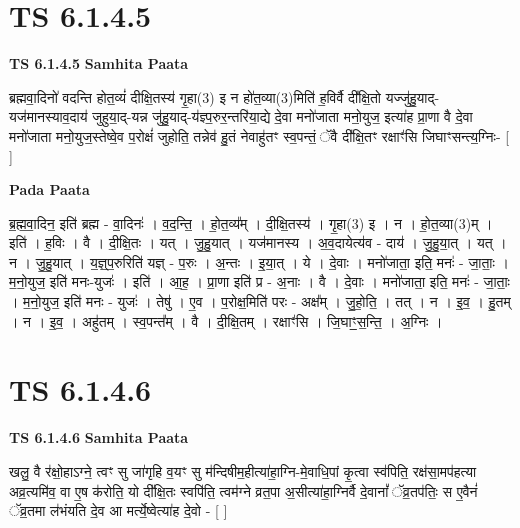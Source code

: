\documentclass[17pt]{extarticle}
\begin{document}
\section*{ TS 6.1.4.5 }

\textbf{TS 6.1.4.5 } \newline
\textbf{Samhita Paata} \newline

ब्रह्मवा॒दिनो॑ वदन्ति होत॒व्यं॑ दीक्षि॒तस्य॑ गृ॒हा(3) इ न हो॑त॒व्या(3)मिति॑ ह॒विर्वै दी᳚क्षि॒तो यज्जु॑हु॒याद्-यज॑मानस्याव॒दाय॑ जुहुया॒द्-यन्न जु॑हु॒याद्-य॑ज्ञ्प॒रुर॒न्तरि॑या॒द्ये दे॒वा मनो॑जाता मनो॒युज॒ इत्या॑ह प्रा॒णा वै दे॒वा मनो॑जाता मनो॒युज॒स्तेष्वे॒व प॒रोक्षं॑ जुहोति॒ तन्नेव॑ हु॒तं नेवाहु॑तꣳ स्व॒पन्तं॒ ॅवै दी᳚क्षि॒तꣳ रक्षाꣳ॑सि जिघाꣳसन्त्य॒ग्निः- [  ] \newline

\textbf{Pada Paata} \newline

ब्र॒ह्म॒वा॒दिन॒ इति॑ ब्रह्म - वा॒दिनः॑ । व॒द॒न्ति॒ । हो॒त॒व्य᳚म् । दी॒क्षि॒तस्य॑ । गृ॒हा(3) इ । न । हो॒त॒व्या(3)म् । इति॑ । ह॒विः । वै । दी॒क्षि॒तः । यत् । जु॒हु॒यात् । यज॑मानस्य । अ॒व॒दायेत्य॑व - दाय॑ । जु॒हु॒या॒त् । यत् । न । जु॒हु॒यात् । य॒ज्ञ्॒प॒रुरिति॑ यज्ञ् - प॒रुः । अ॒न्तः । इ॒या॒त् । ये । दे॒वाः । मनो॑जाता॒ इति॒ मनः॑ - जा॒ताः॒ । म॒नो॒युज॒ इति॑ मनः-युजः॑ । इति॑ । आ॒ह॒ । प्रा॒णा इति॑ प्र - अ॒नाः । वै । दे॒वाः । मनो॑जाता॒ इति॒ मनः॑ - जा॒ताः॒ । म॒नो॒युज॒ इति॑ मनः - युजः॑ । तेषु॑ । ए॒व । प॒रोक्ष॒मिति॑ परः - अक्ष᳚म् । जु॒हो॒ति॒ । तत् । न । इ॒व॒ । हु॒तम् । न । इ॒व॒ । अहु॑तम् । स्व॒पन्त᳚म् । वै । दी॒क्षि॒तम् । रक्षाꣳ॑सि । जि॒घाꣳ॒॒स॒न्ति॒ । अ॒ग्निः ।  \newline




\section*{ TS 6.1.4.6 }

\textbf{TS 6.1.4.6 } \newline
\textbf{Samhita Paata} \newline

खलु॒ वै र॑क्षो॒हाऽग्ने॒ त्वꣳ सु जा॑गृहि व॒यꣳ सु म॑न्दिषीम॒हीत्या॑हा॒ग्नि-मे॒वाधि॒पां कृ॒त्वा स्व॑पिति॒ रक्ष॑सा॒मप॑हत्या अव्र॒त्यमि॑व॒ वा ए॒ष क॑रोति॒ यो दी᳚क्षि॒तः स्वपि॑ति॒ त्वम॑ग्ने व्रत॒पा अ॒सीत्या॑हा॒ग्निर्वै दे॒वानां᳚ ॅव्र॒तप॑तिः॒ स ए॒वैनं॑ ॅव्र॒तमा ल॑भंयति दे॒व आ मर्त्ये॒ष्वेत्या॑ह दे॒वो - [  ] \newline
\end{document}
